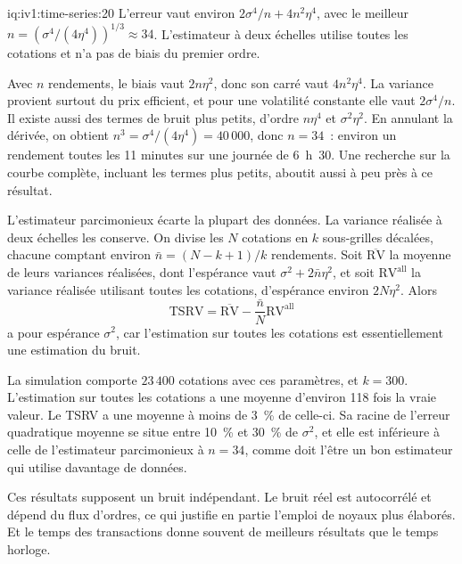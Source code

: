 \begin{solution}{iq:iv1:time-series:20}
L'erreur vaut environ $2\sigma^4/n + 4n^2\eta^4$, avec le meilleur $n = (\sigma^4/(4\eta^4))^{1/3} \approx 34$. L'estimateur à deux échelles utilise toutes les cotations et n'a pas de biais du premier ordre.

Avec $n$ rendements, le biais vaut $2n\eta^2$, donc son carré vaut $4n^2\eta^4$. La variance provient surtout du prix efficient, et pour une volatilité constante elle vaut $2\sigma^4/n$. Il existe aussi des termes de bruit plus petits, d'ordre $n\eta^4$ et $\sigma^2\eta^2$. En annulant la dérivée, on obtient $n^3 = \sigma^4/(4\eta^4) = 40\,000$, donc $n = 34$~: environ un rendement toutes les 11 minutes sur une journée de 6~h~30. Une recherche sur la courbe complète, incluant les termes plus petits, aboutit aussi à peu près à ce résultat.

L'estimateur parcimonieux écarte la plupart des données. La variance réalisée à deux échelles les conserve. On divise les $N$ cotations en $k$ sous-grilles décalées, chacune comptant environ $\bar{n} = (N - k + 1)/k$ rendements. Soit $\overline{\mathrm{RV}}$ la moyenne de leurs variances réalisées, dont l'espérance vaut $\sigma^2 + 2\bar{n}\eta^2$, et soit $\mathrm{RV}^{\text{all}}$ la variance réalisée utilisant toutes les cotations, d'espérance environ $2N\eta^2$. Alors
\[
\mathrm{TSRV} = \overline{\mathrm{RV}} - \frac{\bar{n}}{N}\mathrm{RV}^{\text{all}}
\]
a pour espérance $\sigma^2$, car l'estimation sur toutes les cotations est essentiellement une estimation du bruit.

La simulation comporte $23\,400$ cotations avec ces paramètres, et $k = 300$. L'estimation sur toutes les cotations a une moyenne d'environ 118 fois la vraie valeur. Le TSRV a une moyenne à moins de 3~\% de celle-ci. Sa racine de l'erreur quadratique moyenne se situe entre 10~\% et 30~\% de $\sigma^2$, et elle est inférieure à celle de l'estimateur parcimonieux à $n = 34$, comme doit l'être un bon estimateur qui utilise davantage de données.

Ces résultats supposent un bruit indépendant. Le bruit réel est autocorrélé et dépend du flux d'ordres, ce qui justifie en partie l'emploi de noyaux plus élaborés. Et le temps des transactions donne souvent de meilleurs résultats que le temps horloge.



\end{solution}
